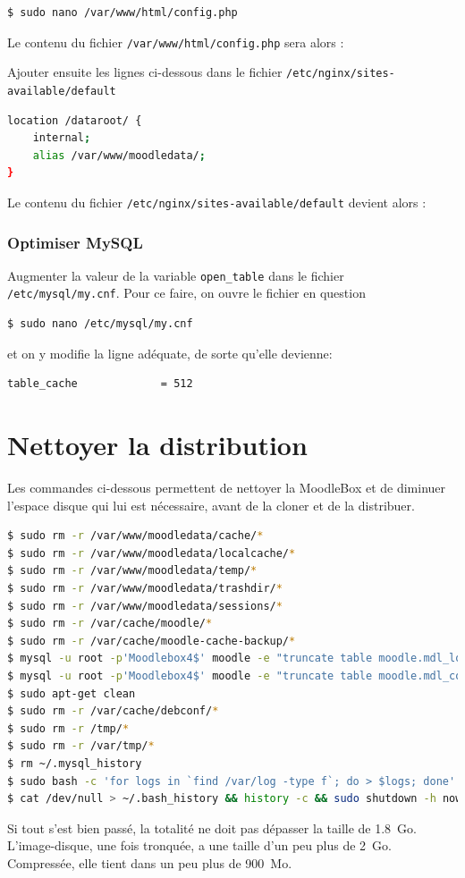 \documentclass[11pt]{article}
\begin{document}
\begin{lstlisting}[language=bash]
$ sudo nano /var/www/html/config.php
\end{lstlisting}

Le contenu du fichier \lstinline{/var/www/html/config.php} sera alors : 


Ajouter ensuite les lignes ci-dessous dans le fichier \lstinline{/etc/nginx/sites-available/default}

\begin{lstlisting}[language=bash]
location /dataroot/ {
    internal;
    alias /var/www/moodledata/;
}
\end{lstlisting}

Le contenu du fichier \lstinline{/etc/nginx/sites-available/default} devient alors : 


\subsubsection{Optimiser MySQL}

Augmenter la valeur de la variable \lstinline{open_table} dans le fichier \lstinline{/etc/mysql/my.cnf}. Pour ce faire, on ouvre le fichier en question
\begin{lstlisting}[language=bash]
$ sudo nano /etc/mysql/my.cnf
\end{lstlisting}

et on y modifie la ligne adéquate, de sorte qu'elle devienne:
\begin{lstlisting}[language=bash]
table_cache             = 512
\end{lstlisting}

\section{Nettoyer la distribution}

Les commandes ci-dessous permettent de nettoyer la MoodleBox et de diminuer l'espace disque qui lui est nécessaire, avant de la cloner et de la distribuer.

\begin{lstlisting}[language=bash]
$ sudo rm -r /var/www/moodledata/cache/*
$ sudo rm -r /var/www/moodledata/localcache/*
$ sudo rm -r /var/www/moodledata/temp/*
$ sudo rm -r /var/www/moodledata/trashdir/*
$ sudo rm -r /var/www/moodledata/sessions/*
$ sudo rm -r /var/cache/moodle/*
$ sudo rm -r /var/cache/moodle-cache-backup/*
$ mysql -u root -p'Moodlebox4$' moodle -e "truncate table moodle.mdl_logstore_standard_log"
$ mysql -u root -p'Moodlebox4$' moodle -e "truncate table moodle.mdl_config_log"
$ sudo apt-get clean
$ sudo rm -r /var/cache/debconf/*
$ sudo rm -r /tmp/*
$ sudo rm -r /var/tmp/*
$ rm ~/.mysql_history
$ sudo bash -c 'for logs in `find /var/log -type f`; do > $logs; done'
$ cat /dev/null > ~/.bash_history && history -c && sudo shutdown -h now
\end{lstlisting}

Si tout s'est bien passé, la totalité ne doit pas dépasser la taille de 1.8~Go. L'image-disque, une fois tronquée, a une taille d'un peu plus de 2~Go. Compressée, elle tient dans un peu plus de 900~Mo. 
\end{document}
